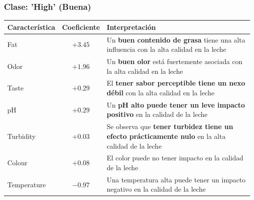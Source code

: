 \documentclass[12pt,a4paper]{article}
\begin{document}
\begin{itemize}
							\subsubsection*{Clase: 'High' (Buena)}
							\begin{center}
							\begin{tabular}{lcp{8cm}}
							\hline
							\textbf{Característica} & \textbf{Coeficiente} & \textbf{Interpretación} \\
							\hline
							Fat         & $+3.45$ &  Un \textbf{buen contenido de grasa} tiene una alta influencia con la alta calidad en la leche \\
							Odor        & $+1.96$ & Un \textbf{buen olor} está fuertemente asociada con la alta calidad en la leche \\
							Taste       & $+0.29$ & El \textbf{tener sabor perceptible tiene un nexo débil} con la alta calidad en la leche \\
							pH          & $+0.29$ & Un \textbf{pH alto puede tener un leve impacto positivo} en la calidad de la leche \\
							Turbidity   & $+0.03$ & Se observa que \textbf{tener turbidez tiene un efecto prácticamente nulo} en la alta calidad de la leche \\
							Colour      & $+0.08$ & El color puede no tener impacto en la calidad de la leche \\
							Temperature & $\mathbf{-0.97}$ & Una temperatura alta puede tener un impacto negativo en la calidad de la leche \\
							\hline
							\end{tabular}
							\end{center}
							

\end{itemize}
\end{document}
